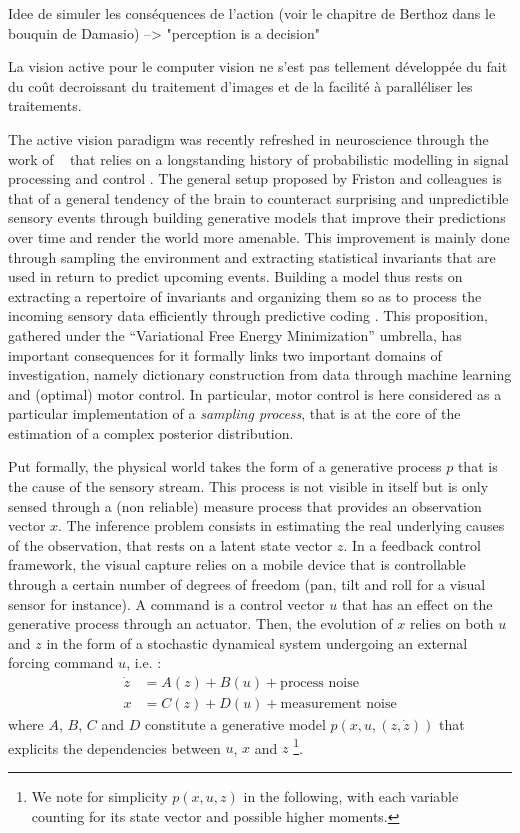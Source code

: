 \documentclass[12pt,twoside,openright]{article}
\begin{document}
    
	{\color{green} Idee de simuler les conséquences de l'action (voir le chapitre de Berthoz dans le bouquin de Damasio) --> "perception is a decision"}

	{\color{green} La vision active pour le computer vision ne s'est pas tellement développée du fait du coût decroissant du traitement d'images et de la facilité à paralléliser les traitements.}

	The active vision paradigm was recently refreshed in neuroscience through the work of ~\cite{friston2010free,friston2012perceptions} that relies on a longstanding history of probabilistic modelling in signal processing and control \cite{Kalman1960,Baum1966,friston1994statistical}. 
	The general setup proposed by Friston and colleagues is that of a general tendency of the brain to counteract surprising and unpredictible sensory events through building generative models that improve their predictions over time and render the world more amenable. This improvement is mainly done through sampling the environment and extracting statistical invariants that are used in return to predict upcoming events.
	Building a model thus rests on extracting a repertoire of invariants and organizing them so as to process the incoming sensory data efficiently through predictive coding \cite{rao1999predictive}. This proposition, gathered under the ``Variational Free Energy Minimization'' umbrella, has important consequences for it formally links two important domains of investigation, namely dictionary construction from data through machine learning and (optimal) motor control.
	In particular, motor control is here considered as a particular implementation of a \emph{sampling process}, that is at the core of the estimation of a complex posterior distribution. 
	
	Put formally, the physical world  takes the form of a generative process $p$ that is the cause of the sensory stream. This process is not visible in itself but is only sensed through a (non reliable) measure process that provides an observation vector $x$. The inference problem consists in estimating the real underlying causes of the observation, that rests on a latent state vector $z$. In a feedback control framework, the visual capture relies on a mobile device that is controllable through a certain number of degrees of freedom (pan, tilt and roll for a visual sensor for instance). A command is a control vector $u$ that has an effect on the generative process through an actuator. Then, the evolution of $x$ relies on both $u$ and $z$ in the form of a stochastic dynamical system undergoing an external forcing command $u$, i.e. :
	\begin{align}
	  \dot{z} &= A(z) + B(u) + \text{process noise}\nonumber\\
	  x &= C(z) + D(u) + \text{measurement noise} 
	  \label{eq:kalman}
	\end{align}  
	where $A$, $B$, $C$ and $D$ constitute a generative model $p(x,u,(z,\dot{z}))$ that explicits the dependencies between $u$, $x$ and $z$ \footnote{We note for simplicity $p(x,u,z)$ in the following, with each variable counting for its state vector and possible higher moments.}. 
	
\end{document}
